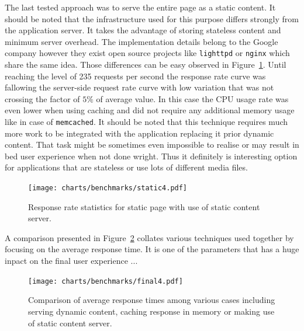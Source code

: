 The last tested approach was to serve the entire page as a static content. It should be noted that the infrastructure used for this purpose differs strongly from the application server. It takes the advantage of storing stateless content and minimum server overhead. The implementation details belong to the Google company however they exist open source projects like \texttt{lighttpd} or \texttt{nginx} which share the same idea. Those differences can be easy observed in Figure~\ref{fig:sm_benchmark_static}. Until reaching the level of 235 requests per second the response rate curve was fallowing the server-side request rate curve with low variation that was not crossing the factor of $5 \%$ of average value. In this case the CPU usage rate was even lower when using caching and did not require any additional memory usage like in case of \texttt{memcached}. It should be noted that this technique requires much more work to be integrated with the application replacing it prior dynamic content. That task might be sometimes even impossible to realise or may result in bed user experience when not done wright. Thus it definitely is interesting option for applications that are stateless or use lots of different media files.             
 \begin{figure}[ht]
  \begin{center}
	\texttt{[image: charts/benchmarks/static4.pdf]}
  \end{center}
  \caption{Response rate statistics for static page with use of static content server.}
\label{fig:sm_benchmark_static}
\end{figure}

A comparison presented in Figure~\ref{fig:sm_resp_time_comapre} collates various techniques used together by focusing on the average response time. It is one of the parameters that has a huge inpact on the final user experience ...   
\begin{figure}[ht]
  \begin{center}
	\texttt{[image: charts/benchmarks/final4.pdf]}
  \end{center}
  \caption{Comparison of average response times among various cases including serving dynamic content, caching response in memory or making use of static content server.}
	\label{fig:sm_resp_time_comapre}
\end{figure}  